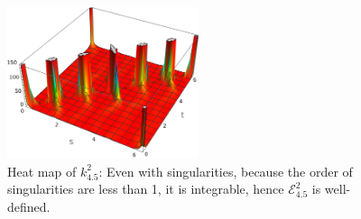 \documentclass[../dissertation.tex]{subfiles}
\begin{document}
\begin{figure}[tpb]
    \centering
    \includegraphics[width=0.5\textwidth]{sections/tangentPointEnergyImgs/kHeatMap3}
    \caption{Heat map of $k_{4.5}^{2}$: Even with singularities, because the order of singularities are less than 1, it is integrable, hence $\mathcal{E}_{4.5}^{2}$ is well-defined.}
    \label{fig: Low-Order Pole}
\end{figure}
\end{document}
